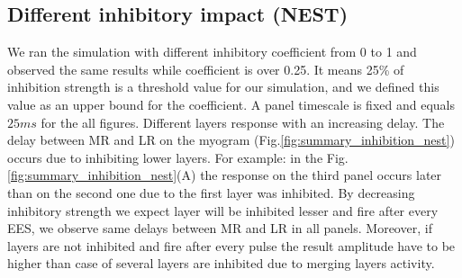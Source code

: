 \documentclass[]{elsarticle}
\begin{document}

\subsection{Different inhibitory impact (NEST)}

We ran the simulation with different inhibitory coefficient from 0 to 1 and observed the same results while coefficient is over 0.25. It means 25\% of inhibition strength is a threshold value for our simulation, and we defined this value as an upper bound for the coefficient. A panel timescale is fixed and equals $25 ms$ for the all figures. Different layers response with an increasing delay. The delay between MR and LR on the myogram (Fig.\ref{fig:summary_inhibition_nest}) occurs due to inhibiting lower layers. For example: in the Fig.\ref{fig:summary_inhibition_nest}(A) the response on the third panel occurs later than on the second one due to the first layer was inhibited. By decreasing inhibitory strength we  expect layer will  be inhibited lesser and fire after every EES, we observe same delays between MR and LR in all panels. Moreover, if layers are not inhibited and fire after every pulse the result amplitude have to be higher than case of several layers are inhibited due to merging layers activity.
\end{document}
